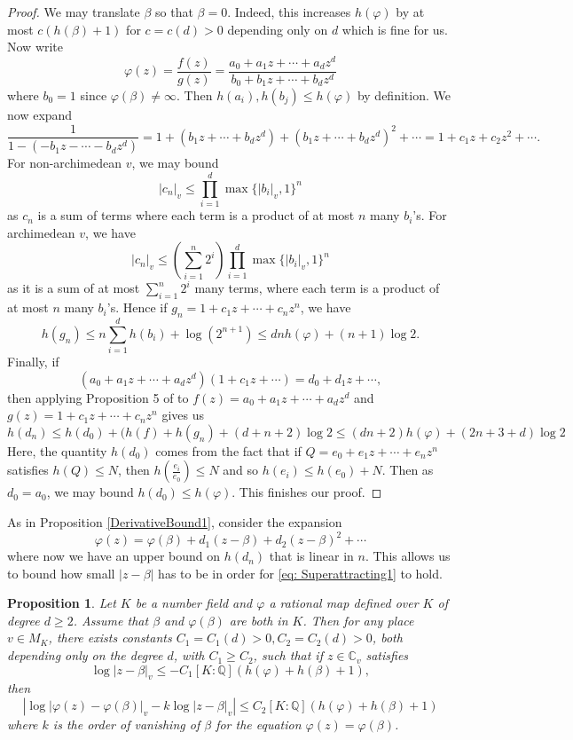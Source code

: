 \documentclass[10pt, reqno]{amsart}
\newcommand{\bb}{\mathbb}
\newcommand{\vphi}{\varphi}
\numberwithin{theorem}{section}
\newtheorem{proposition}[theorem]{Proposition}
\numberwithin{equation}{section}
\numberwithin{example}{section}
\numberwithin{definition}{section}
\begin{document}
\begin{proof}
We may translate $\beta$ so that $\beta = 0$. Indeed, this increases $h(\vphi)$ by at most $c(h(\beta)+1)$ for $c = c(d) > 0$ depending only on $d$ which is fine for us. Now write 
$$\vphi(z) = \frac{f(z)}{g(z)} = \frac{a_0 + a_1 z + \cdots + a_d z^d}{b_0 + b_1 z + \cdots + b_d z^d}$$
where $b_0 = 1$ since $\vphi(\beta) \not = \infty$. Then $h(a_i),h(b_j) \leq h(\vphi)$ by definition. We now expand 
$$\frac{1}{1 -(- b_1z - \cdots - b_dz^d)} = 1 + (b_1z + \cdots + b_d z^d) + (b_1z + \cdots + b_d z^d)^2 + \cdots = 1 + c_1z + c_2 z^2 + \cdots.$$
For non-archimedean $v$, we may bound 
$$|c_n|_v \leq \prod_{i=1}^{d} \max\{|b_i|_v,1\}^n $$
as $c_n$ is a sum of terms where each term is a product of at most $n$ many $b_i$'s. For archimedean $v$, we have 
$$|c_n|_v \leq  (\sum_{i=1}^{n} 2^i) \prod_{i=1}^{d} \max\{|b_i|_v,1\}^n$$
as it is a sum of at most $\sum_{i=1}^{n} 2^i$ many terms, where each term is a product of at most $n$ many $b_i$'s. 
Hence if $g_n = 1 + c_1 z + \cdots + c_n z^n$, we have 
$$h(g_n) \leq n \sum_{i=1}^{d} h(b_i) + \log( 2^{n+1}) \leq dn h(\vphi) + (n+1) \log 2.$$
Finally, if 
$$(a_0 + a_1 z + \cdots + a_d z^d)(1 + c_1 z + \cdots) = d_0 + d_1 z + \cdots,$$
then applying Proposition 5 of \cite{HS11} to $f(z) = a_0 + a_1z + \cdots + a_d z^d$ and $g(z) = 1 + c_1z + \cdots + c_n z^n$ gives us 
$$h(d_n) \leq h(d_0) + (h(f) + h(g_n) + (d+n+2) \log 2 \leq (dn+2) h(\vphi) + (2n+3 + d)\log 2$$
Here, the quantity $h(d_0)$ comes from the fact that if $Q = e_0 + e_1 z + \cdots + e_n z^n$ satisfies $h(Q) \leq N$, then $h(\frac{e_i}{e_0}) \leq N$ and so $h(e_i) \leq h(e_0) + N$. Then as $d_0 = a_0$, we may bound $h(d_0) \leq h(\vphi)$. This finishes our proof. 
\end{proof}

As in Proposition \ref{DerivativeBound1}, consider the expansion 
$$\vphi(z) = \vphi(\beta) + d_1 (z-\beta) + d_2 (z-\beta)^2 + \cdots$$
where now we have an upper bound on $h(d_n)$ that is linear in $n$. This allows us to bound how small $|z-\beta|$ has to be in order for \eqref{eq: Superattracting1} to hold.

\begin{proposition} \label{DerivativeBound2}
Let $K$ be a number field and $\vphi$ a rational map defined over $K$ of degree $d \geq 2$. Assume that $\beta$ and $\vphi(\beta)$ are both in $K$. Then for any place $v \in M_K$, there exists constants $C_1 = C_1 (d) > 0, C_2 = C_2(d) > 0$, both depending only on the degree $d$, with $C_1 \geq C_2$, such that if $z \in \bb{C}_v$ satisfies 
\begin{equation} \label{eq: SuperAttracting2}
\log |z-\beta|_v \leq -C_1[K:\bb{Q}](h(\vphi) + h(\beta)+1),
\end{equation}
then
$$\left| \log |\vphi(z)-\vphi(\beta)|_v - k \log |z-\beta|_v \right| \leq C_2 [K:\bb{Q}](h(\vphi) + h(\beta) + 1)$$
where $k$ is the order of vanishing of $\beta$ for the equation $\vphi(z) = \vphi(\beta)$. 
\end{proposition}
\end{document}
